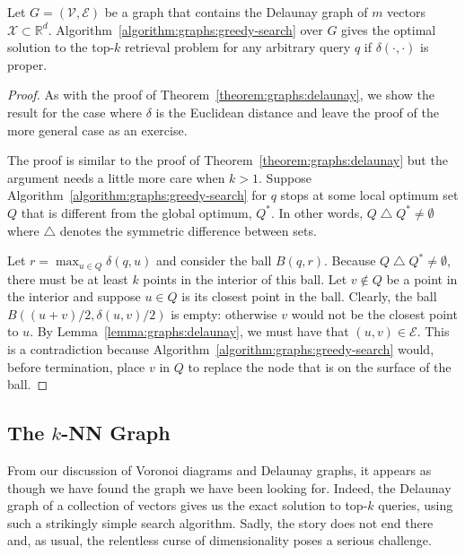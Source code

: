 \begin{theorem}
    \label{theorem:graphs:delaunay:top-k}
    Let $G = (\mathcal{V}, \mathcal{E})$ be a graph that contains the Delaunay graph of $m$ vectors
    $\mathcal{X} \subset \mathbb{R}^d$.
    Algorithm~\ref{algorithm:graphs:greedy-search} over $G$ gives the optimal solution to the top-$k$ retrieval problem
    for any arbitrary query $q$ if $\delta(\cdot, \cdot)$ is proper.
\end{theorem}
\begin{proof}
    As with the proof of Theorem~\ref{theorem:graphs:delaunay},
    we show the result for the case where $\delta$ is the Euclidean
    distance and leave the proof of the more general case as an exercise.
    
    The proof is similar to the proof of Theorem~\ref{theorem:graphs:delaunay} but the argument
    needs a little more care when $k > 1$.
    Suppose Algorithm~\ref{algorithm:graphs:greedy-search} for $q$ stops at some local optimum set
    $Q$ that is different from the global optimum, $Q^\ast$. In other words,
    $Q \;\triangle\; Q^\ast \neq \emptyset$ where $\triangle$ denotes the symmetric difference between
    sets.

    Let $r = \max_{u \in Q} \delta(q, u)$ and consider the ball $B(q, r)$.
    Because $Q \;\triangle\; Q^\ast \neq \emptyset$, there must be at least $k$ points in the interior of this ball.
    Let $v \notin Q$ be a point in the interior and suppose $u \in Q$ is its closest point in the ball.
    Clearly, the ball $B((u + v)/2, \delta(u, v)/2)$ is empty:
    otherwise $v$ would not be the closest point to $u$.
    By Lemma~\ref{lemma:graphs:delaunay}, we must have that $(u, v) \in \mathcal{E}$.
    This is a contradiction because Algorithm~\ref{algorithm:graphs:greedy-search} would, before termination,
    place $v$ in $Q$ to replace the node that is on the surface of the ball.
\end{proof}

\subsection{The \texorpdfstring{$k$}{k}-NN Graph}

From our discussion of Voronoi diagrams and Delaunay graphs, it appears as though we have
found the graph we have been looking for. Indeed, the Delaunay graph of a collection of vectors
gives us the exact solution to top-$k$ queries, using such a strikingly simple search algorithm.
Sadly, the story does not end there and, as usual,
the relentless curse of dimensionality poses a serious challenge.

